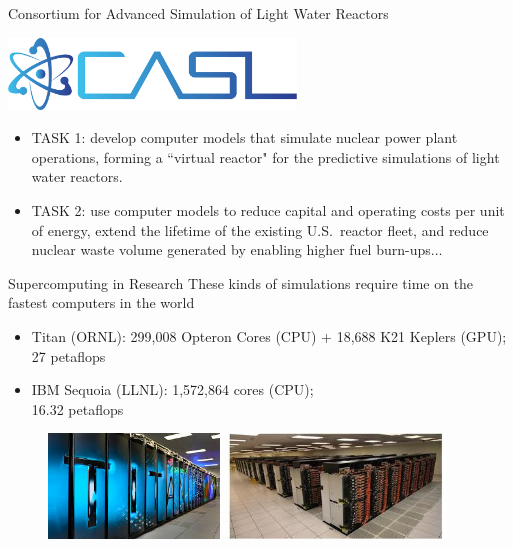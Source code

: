 \documentclass[xcolor=x11names,compress]{beamer}
\renewcommand{\(}{\begin{columns}}
\renewcommand{\)}{\end{columns}}
\newcommand{\<}[1]{\begin{column}{#1}}
\renewcommand{\>}{\end{column}}
\begin{document}
\begin{frame}{Consortium for Advanced Simulation of Light Water Reactors}
\begin{center}
\includegraphics[height=0.75in,clip]{CASL}
\end{center}
\begin{itemize}
\item \textcolor{RawSienna}{TASK 1}: develop computer models that simulate nuclear power plant operations, forming a ``virtual reactor" for the predictive simulations of light water reactors. 
\item \textcolor{RawSienna}{TASK 2}: use computer models to reduce capital and operating costs per unit of energy, extend the lifetime of the existing U.S.\ reactor fleet, and reduce nuclear waste volume generated by enabling higher fuel burn-ups... %
\end{itemize}
\end{frame}

\begin{frame}{Supercomputing in Research}
These kinds of simulations require time on the fastest computers in the world
\begin{itemize}
\item \textcolor{RawSienna}{Titan} (ORNL): 299,008 Opteron Cores (CPU) + 18,688 K21 Keplers (GPU); \textcolor{dgreen}{27 petaflops}
\item \textcolor{RawSienna}{IBM Sequoia} (LLNL): 1,572,864 cores (CPU); \\\textcolor{dgreen}{16.32 petaflops}
\end{itemize}
\begin{figure}
\includegraphics[height=1.1in,clip]{Titan}
\hfill
\includegraphics[height=1.1in,clip]{Sequoia}
\end{figure}
\end{frame}
\end{document}
